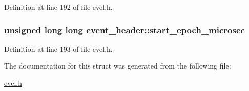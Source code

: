 Definition at line 192 of file evel.\+h.

\hypertarget{structevent__header_af1abe603869530794daf1f4969c6b50c}{}
\subsubsection[{start\+\_\+epoch\+\_\+microsec}]{\setlength{\rightskip}{0pt plus 5cm}unsigned long long event\+\_\+header\+::start\+\_\+epoch\+\_\+microsec}\label{structevent__header_af1abe603869530794daf1f4969c6b50c}


Definition at line 193 of file evel.\+h.



The documentation for this struct was generated from the following file\+:\begin{DoxyCompactItemize}
\item 
\hyperlink{evel_8h}{evel.\+h}\end{DoxyCompactItemize}
